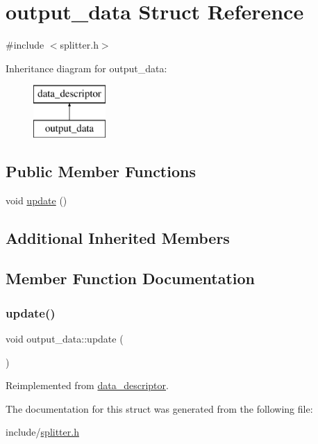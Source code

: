 \hypertarget{structoutput__data}{}\section{output\+\_\+data Struct Reference}
\label{structoutput__data}


{\ttfamily \#include $<$splitter.\+h$>$}

Inheritance diagram for output\+\_\+data\+:\begin{figure}[H]
\begin{center}
\leavevmode
\includegraphics[height=2.000000cm]{structoutput__data}
\end{center}
\end{figure}
\subsection*{Public Member Functions}
\begin{DoxyCompactItemize}
\item 
void \hyperlink{structoutput__data_ad3dd0b4e74cd55dee641af403690ed64}{update} ()
\end{DoxyCompactItemize}
\subsection*{Additional Inherited Members}


\subsection{Member Function Documentation}
\mbox{\label{structoutput__data_ad3dd0b4e74cd55dee641af403690ed64}} 
\subsubsection{\texorpdfstring{update()}{update()}}
{\footnotesize\ttfamily void output\+\_\+data\+::update (\begin{DoxyParamCaption}{ }\end{DoxyParamCaption})\hspace{0.3cm}{\ttfamily [virtual]}}



Reimplemented from \hyperlink{structdata__descriptor_ad6cd92beb7d2b9291e0d130a24faa380}{data\+\_\+descriptor}.



The documentation for this struct was generated from the following file\+:\begin{DoxyCompactItemize}
\item 
include/\hyperlink{splitter_8h}{splitter.\+h}\end{DoxyCompactItemize}

